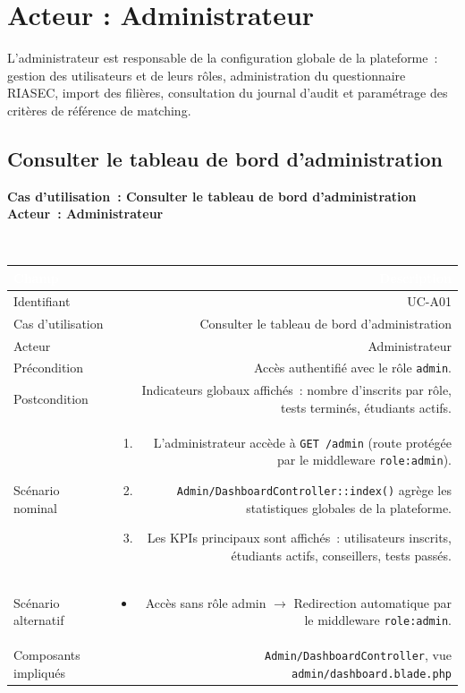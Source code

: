 \documentclass[a4paper,12pt]{article}
\newcommand{\ucheader}[2]{%
  \noindent\colorbox{capblue}{\parbox{\dimexpr\linewidth-2\fboxsep}{%
    \color{white}\bfseries\large Cas d'utilisation~: #1 \hfill \normalsize Acteur~: #2
  }}\\[2pt]
}
\begin{document}
\newpage

\section{Acteur : Administrateur}

L'administrateur est responsable de la configuration globale de la plateforme~: gestion des utilisateurs et de leurs rôles, administration du questionnaire RIASEC, import des filières, consultation du journal d'audit et paramétrage des critères de référence de matching.

\subsection{Consulter le tableau de bord d'administration}
\ucheader{Consulter le tableau de bord d'administration}{Administrateur}

\noindent
\begin{tabular}{|L|R|}
\hline
{}\textcolor{white}{\textbf{Champ}} & \textcolor{white}{\textbf{Description}} \\
\hline
{}Identifiant & UC-A01 \\
\hline
Cas d'utilisation & Consulter le tableau de bord d'administration \\
\hline
{}Acteur & Administrateur \\
\hline
Précondition & Accès authentifié avec le rôle \texttt{admin}. \\
\hline
{}Postcondition & Indicateurs globaux affichés~: nombre d'inscrits par rôle, tests terminés, étudiants actifs. \\
\hline
Scénario nominal &
\begin{enumerate}
  \item L'administrateur accède à \texttt{GET /admin} (route protégée par le middleware \texttt{role:admin}).
  \item \texttt{Admin/DashboardController::index()} agrège les statistiques globales de la plateforme.
  \item Les KPIs principaux sont affichés~: utilisateurs inscrits, étudiants actifs, conseillers, tests passés.
\end{enumerate} \\
\hline
{}Scénario alternatif &
\begin{itemize}
  \item Accès sans rôle admin $\rightarrow$ Redirection automatique par le middleware \texttt{role:admin}.
\end{itemize} \\
\hline
Composants impliqués & \texttt{Admin/DashboardController}, vue \texttt{admin/dashboard.blade.php} \\
\hline
\end{tabular}
\end{document}
